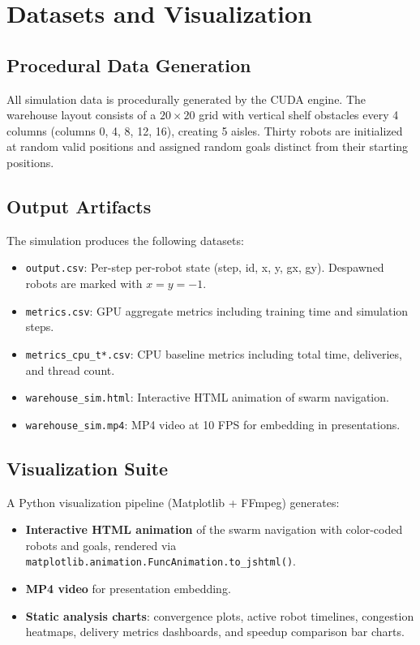 \documentclass[12pt,a4paper]{article}
\begin{document}
\newpage
\section{Datasets and Visualization}

\subsection{Procedural Data Generation}
All simulation data is procedurally generated by the CUDA engine. The warehouse layout consists of a $20 \times 20$ grid with vertical shelf obstacles every 4 columns (columns 0, 4, 8, 12, 16), creating 5 aisles. Thirty robots are initialized at random valid positions and assigned random goals distinct from their starting positions.

\subsection{Output Artifacts}
The simulation produces the following datasets:
\begin{itemize}
    \item \texttt{output.csv}: Per-step per-robot state (step, id, x, y, gx, gy). Despawned robots are marked with $x = y = -1$.
    \item \texttt{metrics.csv}: GPU aggregate metrics including training time and simulation steps.
    \item \texttt{metrics\_cpu\_t*.csv}: CPU baseline metrics including total time, deliveries, and thread count.
    \item \texttt{warehouse\_sim.html}: Interactive HTML animation of swarm navigation.
    \item \texttt{warehouse\_sim.mp4}: MP4 video at 10 FPS for embedding in presentations.
\end{itemize}

\subsection{Visualization Suite}
A Python visualization pipeline (Matplotlib + FFmpeg) generates:
\begin{itemize}
    \item \textbf{Interactive HTML animation} of the swarm navigation with color-coded robots and goals, rendered via \texttt{matplotlib.animation.FuncAnimation.to\_jshtml()}.
    \item \textbf{MP4 video} for presentation embedding.
    \item \textbf{Static analysis charts}: convergence plots, active robot timelines, congestion heatmaps, delivery metrics dashboards, and speedup comparison bar charts.
\end{itemize}
\end{document}
